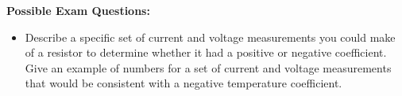 \textbf{Possible Exam Questions:}

\begin{itemize}
\item Describe a specific set of current and voltage measurements you could make of a resistor to determine whether it had a positive or negative coefficient.  Give an example of numbers for a set of current and voltage measurements that would be consistent with a negative temperature coefficient.
\end{itemize}





